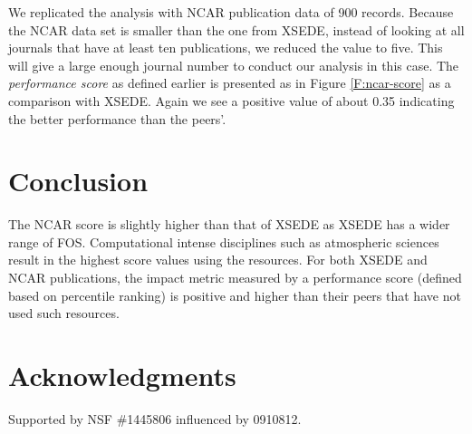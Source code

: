 \documentclass[10pt, conference, compsocconf]{IEEEtran}
\begin{document}
We replicated the analysis with NCAR publication data of 900 records. Because the NCAR data set is smaller than the one from XSEDE, instead of looking at all journals that have at least ten publications, we reduced the value to five. This will give a large enough journal number to conduct our analysis in this case. The \emph{performance score} as defined earlier is presented as in Figure \ref{F:ncar-score} as a comparison with XSEDE. Again we see a positive value of about 0.35 indicating the better performance than the peers'.

\section{Conclusion} \label{S:conclusion}

The NCAR score is slightly higher than that of XSEDE as XSEDE has a wider range of FOS. Computational intense disciplines such as atmospheric sciences result in the highest score values using the resources. For both XSEDE and NCAR publications, the impact metric measured by a performance score (defined based on percentile ranking) is positive and higher than their peers that have not used such resources.


\section*{Acknowledgments}

Supported by NSF \#1445806 influenced by 0910812.
 

%
% 


\end{document}
